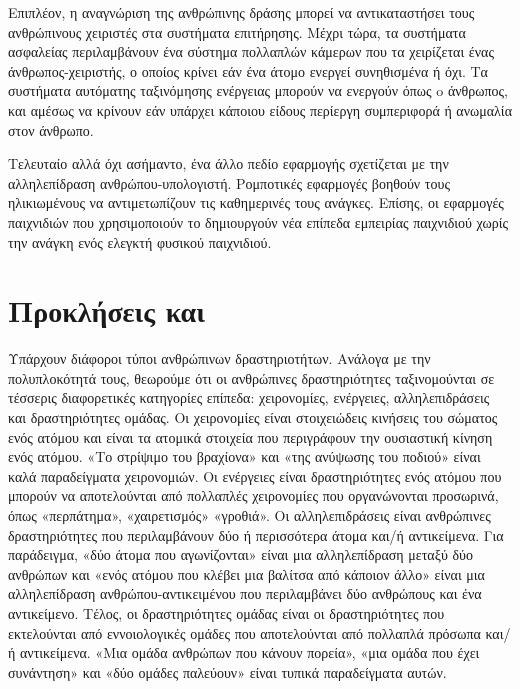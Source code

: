 Επιπλέον, η αναγνώριση της ανθρώπινης δράσης μπορεί να αντικαταστήσει τους ανθρώπινους χειριστές στα συστήματα επιτήρησης. Μέχρι τώρα,
τα συστήματα ασφαλείας περιλαμβάνουν ένα σύστημα πολλαπλών κάμερων που τα χειρίζεται ένας άνθρωπος-χειριστής, ο οποίος κρίνει εάν ένα άτομο
ενεργεί συνηθισμένα ή όχι. Τα συστήματα αυτόματης ταξινόμησης ενέργειας μπορούν να ενεργούν όπως o άνθρωπος, και αμέσως να κρίνουν
εάν υπάρχει κάποιου είδους περίεργη συμπεριφορά ή ανωμαλία στον άνθρωπο.

Τελευταίο αλλά όχι ασήμαντο, ένα άλλο πεδίο εφαρμογής σχετίζεται με την αλληλεπίδραση ανθρώπου-υπολογιστή. Ρομποτικές εφαρμογές
βοηθούν τους ηλικιωμένους να αντιμετωπίζουν τις καθημερινές τους ανάγκες. Επίσης, οι εφαρμογές παιχνιδιών που χρησιμοποιούν το  δημιουργούν νέα επίπεδα
εμπειρίας παιχνιδιού χωρίς την ανάγκη ενός ελεγκτή φυσικού παιχνιδιού.


\section{Προκλήσεις και }

Υπάρχουν διάφοροι τύποι ανθρώπινων δραστηριοτήτων. Ανάλογα με την πολυπλοκότητά τους, θεωρούμε ότι οι ανθρώπινες δραστηριότητες ταξινομούνται σε τέσσερις διαφορετικές κατηγορίες
επίπεδα: χειρονομίες, ενέργειες, αλληλεπιδράσεις και δραστηριότητες ομάδας. Οι χειρονομίες είναι στοιχειώδεις κινήσεις του σώματος ενός ατόμου και είναι τα ατομικά
στοιχεία που περιγράφουν την ουσιαστική κίνηση ενός ατόμου. «Το στρίψιμο του βραχίονα» και «της ανύψωσης του ποδιού» είναι καλά παραδείγματα χειρονομιών.
Οι ενέργειες είναι δραστηριότητες ενός ατόμου που μπορούν να αποτελούνται από πολλαπλές χειρονομίες που οργανώνονται προσωρινά, όπως «περπάτημα», «χαιρετισμός» «γροθιά».
Οι αλληλεπιδράσεις είναι ανθρώπινες δραστηριότητες που περιλαμβάνουν δύο ή περισσότερα άτομα και/ή αντικείμενα. Για παράδειγμα, «δύο άτομα που αγωνίζονται» είναι 
μια αλληλεπίδραση μεταξύ δύο ανθρώπων και  «ενός ατόμου που κλέβει μια βαλίτσα από κάποιον άλλο» είναι μια αλληλεπίδραση ανθρώπου-αντικειμένου που περιλαμβάνει δύο ανθρώπους και ένα
αντικείμενο. Τέλος, οι δραστηριότητες ομάδας είναι οι δραστηριότητες που εκτελούνται από εννοιολογικές ομάδες που αποτελούνται από πολλαπλά πρόσωπα και/ή αντικείμενα. «Μια ομάδα ανθρώπων
που κάνουν πορεία», «μια ομάδα που έχει συνάντηση» και «δύο ομάδες παλεύουν» είναι τυπικά παραδείγματα αυτών.

